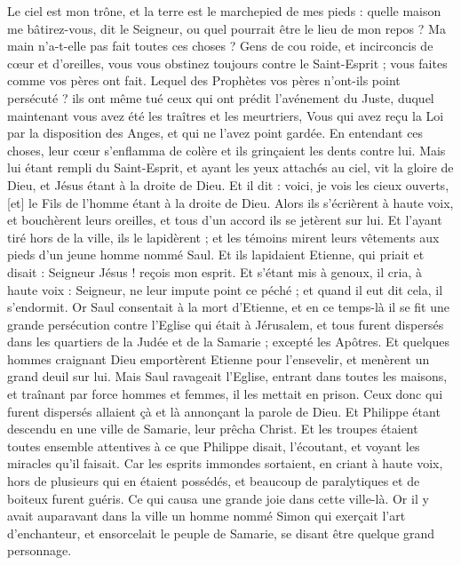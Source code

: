 \begin{multicols}{2}
Le ciel est mon trône, et la terre est le marchepied de mes pieds : quelle maison me bâtirez-vous, dit le Seigneur, ou quel pourrait être le lieu de mon repos ?
Ma main n'a-t-elle pas fait toutes ces choses ?
Gens de cou roide, et incirconcis de cœur et d'oreilles, vous vous obstinez toujours contre le Saint-Esprit ; vous faites comme vos pères ont fait.
Lequel des Prophètes vos pères n'ont-ils point persécuté ? ils ont même tué ceux qui ont prédit l'avénement du Juste, duquel maintenant vous avez été les traîtres et les meurtriers,
Vous qui avez reçu la Loi par la disposition des Anges, et qui ne l'avez point gardée.
En entendant ces choses, leur cœur s'enflamma de colère et ils grinçaient les dents contre lui.
Mais lui étant rempli du Saint-Esprit, et ayant les yeux attachés au ciel, vit la gloire de Dieu, et Jésus étant à la droite de Dieu.
Et il dit : voici, je vois les cieux ouverts, [et] le Fils de l'homme étant à la droite de Dieu.
Alors ils s'écrièrent à haute voix, et bouchèrent leurs oreilles, et tous d'un accord ils se jetèrent sur lui.
Et l'ayant tiré hors de la ville, ils le lapidèrent ; et les témoins mirent leurs vêtements aux pieds d'un jeune homme nommé Saul.
Et ils lapidaient Etienne, qui priait et disait : Seigneur Jésus ! reçois mon esprit.
Et s'étant mis à genoux, il cria, à haute voix : Seigneur, ne leur impute point ce péché ; et quand il eut dit cela, il s'endormit.
\VerseOne{}Or Saul consentait à la mort d'Etienne, et en ce temps-là il se fit une grande persécution contre l'Eglise qui était à Jérusalem, et tous furent dispersés dans les quartiers de la Judée et de la Samarie ; excepté les Apôtres.
Et quelques hommes craignant Dieu emportèrent Etienne pour l'ensevelir, et menèrent un grand deuil sur lui.
Mais Saul ravageait l'Eglise, entrant dans toutes les maisons, et traînant par force hommes et femmes, il les mettait en prison.
Ceux donc qui furent dispersés allaient çà et là annonçant la parole de Dieu.
Et Philippe étant descendu en une ville de Samarie, leur prêcha Christ.
Et les troupes étaient toutes ensemble attentives à ce que Philippe disait, l'écoutant, et voyant les miracles qu'il faisait.
Car les esprits immondes sortaient, en criant à haute voix, hors de plusieurs qui en étaient possédés, et beaucoup de paralytiques et de boiteux furent guéris.
Ce qui causa une grande joie dans cette ville-là.
Or il y avait auparavant dans la ville un homme nommé Simon qui exerçait l'art d'enchanteur, et ensorcelait le peuple de Samarie, se disant être quelque grand personnage.

\end{multicols}
